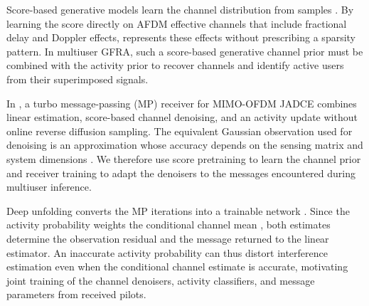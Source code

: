 Score-based generative models learn the channel distribution from
samples \cite{arvinte2023}. By learning the score directly on AFDM
effective channels that include fractional delay and Doppler effects,
\cite{huang2026} represents these effects without prescribing a
sparsity pattern. In multiuser GFRA, such a score-based generative
channel prior must be combined with the activity prior to recover
channels and identify active users from their superimposed signals.

In \cite{cai2026}, a turbo message-passing (MP) receiver for MIMO-OFDM
JADCE combines linear estimation, score-based channel denoising, and
an activity update without online reverse diffusion sampling. The
equivalent Gaussian observation used for denoising is an approximation
whose accuracy depends on the sensing matrix and system dimensions
\cite{cai2026}. We therefore use score pretraining to learn the channel
prior and receiver training to adapt the denoisers to the messages
encountered during multiuser inference.

Deep unfolding converts the MP iterations into a trainable network
\cite{he2020}. Since the activity probability weights the conditional
channel mean \cite{cai2026}, both estimates determine the observation
residual and the message returned to the linear estimator. An inaccurate
activity probability can thus distort interference estimation even
when the conditional channel estimate is accurate, motivating joint
training of the channel denoisers, activity classifiers, and message
parameters from received pilots.

